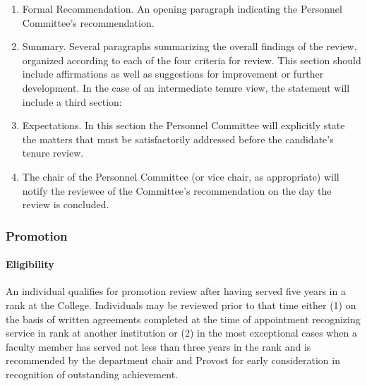 \documentclass[letterpaper, 11pt]{article}
\begin{document}
\begin{enumerate}[label=\arabic*)]
{						\begin{enumerate}[label=\arabic*)]
							\item{Formal Recommendation.  An opening paragraph indicating the Personnel Committee's recommendation.}
							\item{Summary.  Several paragraphs summarizing the overall findings of the review, organized according to each of the four criteria for review.  This section should include affirmations as well as suggestions for improvement or further development.
								In the case of an intermediate tenure view, the statement will include a third section:}
							\item{Expectations.  In this section the Personnel Committee will explicitly state the matters that must be satisfactorily addressed before the candidate's tenure review.}
							\item{  The chair of the Personnel Committee (or vice chair, as appropriate) will notify the reviewee of the Committee's recommendation on the day the review is concluded.}
						\end{enumerate}
					}
				\end{enumerate}
		\subsubsection{Promotion}
			\paragraph{Eligibility}
				An individual qualifies for promotion review after having served five years in a rank at the College.  Individuals may be reviewed prior to that time either (1) on the basis of written agreements completed at the time of appointment recognizing service in rank at another institution or (2) in the most exceptional cases when a faculty member has served not less than three years in the rank and is recommended by the department chair and Provost for early consideration in recognition of outstanding achievement.
\end{document}
